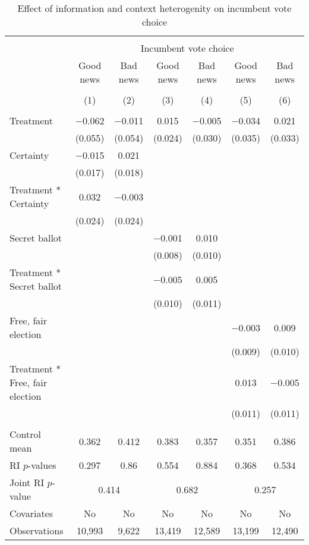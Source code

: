 
\begin{table}[!htbp] \centering 
  \caption{Effect of information and context heterogenity on incumbent vote choice} 
  \label{context_hetero} 
\begin{tabular}{@{\extracolsep{1pt}}lcccccc} 
\\[-1.8ex]\hline 
\hline \\[-1.8ex] 
 & \multicolumn{6}{c}{Incumbent vote choice} \\ 
\cline{2-7} 
 & Good news & Bad news & Good news & Bad news & Good news & Bad news \\ 
\cline{2-7}
\\[-1.8ex] & (1) & (2) & (3) & (4) & (5) & (6)\\ 
\hline \\[-1.8ex] 
 Treatment & $-$0.062 & $-$0.011 & 0.015 & $-$0.005 & $-$0.034 & 0.021 \\ 
  & (0.055) & (0.054) & (0.024) & (0.030) & (0.035) & (0.033) \\ 
  Certainty & $-$0.015 & 0.021 &  &  &  &  \\ 
  & (0.017) & (0.018) &  &  &  &  \\ 
  Treatment * Certainty & 0.032 & $-$0.003 &  &  &  &  \\ 
  & (0.024) & (0.024) &  &  &  &  \\ 
  Secret ballot &  &  & $-$0.001 & 0.010 &  &  \\ 
  &  &  & (0.008) & (0.010) &  &  \\ 
  Treatment * Secret ballot &  &  & $-$0.005 & 0.005 &  &  \\ 
  &  &  & (0.010) & (0.011) &  &  \\ 
  Free, fair election &  &  &  &  & $-$0.003 & 0.009 \\ 
  &  &  &  &  & (0.009) & (0.010) \\ 
  Treatment * Free, fair election &  &  &  &  & 0.013 & $-$0.005 \\ 
  &  &  &  &  & (0.011) & (0.011) \\ 
 \hline \\[-1.8ex] 
Control mean & 0.362 & 0.412 & 0.383 & 0.357 & 0.351 & 0.386 \\ 
RI $p$-values & 0.297 & 0.86 & 0.554 & 0.884 & 0.368 & 0.534 \\ 
Joint RI $p$-value & \multicolumn{2}{c}{0.414} & \multicolumn{2}{c}{0.682} & \multicolumn{2}{c}{0.257}\\
Covariates & No & No & No & No & No & No \\ 
Observations & 10,993 & 9,622 & 13,419 & 12,589 & 13,199 & 12,490 \\ 

\end{tabular}
\end{table}
